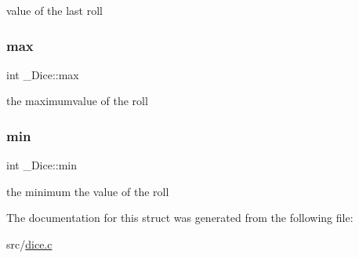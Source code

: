 value of the last roll \mbox{\label{struct__Dice_a2895744914ba9458e96cb7c043c5c1ef}} 
\subsubsection{\texorpdfstring{max}{max}}
{\footnotesize\ttfamily int \+\_\+\+Dice\+::max}

the maximumvalue of the roll \mbox{\label{struct__Dice_a75fd8560afa02172adfe8ac33ca73827}} 
\subsubsection{\texorpdfstring{min}{min}}
{\footnotesize\ttfamily int \+\_\+\+Dice\+::min}

the minimum the value of the roll 

The documentation for this struct was generated from the following file\+:\begin{DoxyCompactItemize}
\item 
src/\hyperlink{dice_8c}{dice.\+c}\end{DoxyCompactItemize}
